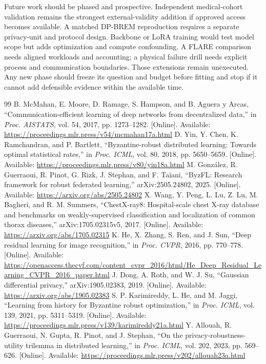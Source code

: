 \documentclass[conference,letterpaper]{IEEEtran}
\begin{document}
Future work should be phased and prospective. Independent medical-cohort validation remains the strongest external-validity addition if approved access becomes available. A matched DP-BREM reproduction requires a separate privacy-unit and protocol design. Backbone or LoRA training would test model scope but adds optimization and compute confounding. A FLARE comparison needs aligned workloads and accounting; a physical failure drill needs explicit process and communication boundaries. Those extensions remain unexecuted. Any new phase should freeze its question and budget before fitting and stop if it cannot add defensible evidence within the available time.

\balance
\begin{thebibliography}{99}
 B. McMahan, E. Moore, D. Ramage, S. Hampson, and B. Aguera y Arcas, ``Communication-efficient learning of deep networks from decentralized data,'' in \emph{Proc. AISTATS}, vol. 54, 2017, pp. 1273--1282. [Online]. Available: \url{https://proceedings.mlr.press/v54/mcmahan17a.html}
 D. Yin, Y. Chen, K. Ramchandran, and P. Bartlett, ``Byzantine-robust distributed learning: Towards optimal statistical rates,'' in \emph{Proc. ICML}, vol. 80, 2018, pp. 5650--5659. [Online]. Available: \url{https://proceedings.mlr.press/v80/yin18a.html}
 M. Gonz\'alez, R. Guerraoui, R. Pinot, G. Rizk, J. Stephan, and F. Ta\"iani, ``ByzFL: Research framework for robust federated learning,'' arXiv:2505.24802, 2025. [Online]. Available: \url{https://arxiv.org/abs/2505.24802}
 X. Wang, Y. Peng, L. Lu, Z. Lu, M. Bagheri, and R. M. Summers, ``ChestX-ray8: Hospital-scale chest X-ray database and benchmarks on weakly-supervised classification and localization of common thorax diseases,'' arXiv:1705.02315v5, 2017. [Online]. Available: \url{https://arxiv.org/abs/1705.02315}
 K. He, X. Zhang, S. Ren, and J. Sun, ``Deep residual learning for image recognition,'' in \emph{Proc. CVPR}, 2016, pp. 770--778. [Online]. Available: \url{https://openaccess.thecvf.com/content_cvpr_2016/html/He_Deep_Residual_Learning_CVPR_2016_paper.html}
 J. Dong, A. Roth, and W. J. Su, ``Gaussian differential privacy,'' arXiv:1905.02383, 2019. [Online]. Available: \url{https://arxiv.org/abs/1905.02383}
 S. P. Karimireddy, L. He, and M. Jaggi, ``Learning from history for Byzantine robust optimization,'' in \emph{Proc. ICML}, vol. 139, 2021, pp. 5311--5319. [Online]. Available: \url{https://proceedings.mlr.press/v139/karimireddy21a.html}
 Y. Allouah, R. Guerraoui, N. Gupta, R. Pinot, and J. Stephan, ``On the privacy-robustness-utility trilemma in distributed learning,'' in \emph{Proc. ICML}, vol. 202, 2023, pp. 569--626. [Online]. Available: \url{https://proceedings.mlr.press/v202/allouah23a.html}

\end{thebibliography}
\end{document}
